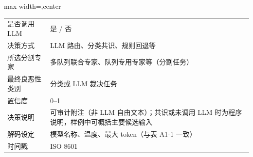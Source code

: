 \begin{responseappendixprose}
\begin{responseinlinetable}
\begin{adjustbox}{max width=\textwidth,center}
\begin{tabular}{ll}
是否调用 LLM & 是 / 否 \\
决策方式 & LLM 路由、分类共识、规则回退等 \\
所选分割专家 & 多队列联合专家、队列专用专家等（分割任务） \\
最终良恶性类别 & 分类或 LLM 裁决任务 \\
置信度 & 0--1 \\
决策说明 & 可审计附注（非 LLM 自由文本）；共识或未调用 LLM 时为程序说明，样例中可概括主要候选输入 \\
解码设定 & 模型名称、温度、最大 token（与表 A1-1 一致） \\
时间戳 & ISO 8601 \\
\bottomrule
\end{tabular}
\end{adjustbox}
\end{responseinlinetable}
\par

\par
\end{responseappendixprose}
\FloatBarrier
\responseproseappendixstart
